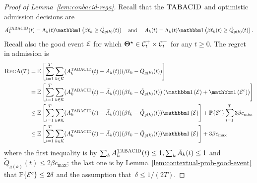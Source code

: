 \begin{proof}[Proof of Lemma~\ref{lem:conbacid-rega}]
Recall that the $\textsc{TABACID}$ and optimistic admission decisions are \[A_k^{\tabacid}(t) = \Lambda_k(t)\indic{\beta \ell_k \geq \tilde{Q}_{g(k)}(t)}\quad\text{and}\quad~\bar{A}_k(t) = \Lambda_k(t)\indic{\beta \bar{\ell}_k(t) \geq \tilde{Q}_{g(k)}(t)}.\] Recall also the good event $\mathcal{E}$ for which $\boldsymbol{\Theta}^\star \in \mathcal{C}_t^+ \times \mathcal{C}_t^-$ for any $t \geq 0$. The regret in admission is
\begin{align}
\textsc{RegA}(T)&=\expect{\sum_{t=1}^T \sum_{k\in\set{K}} (A_k^{\tabacid}(t) - \bar{A}_k(t))(\beta \ell_k-\tilde{Q}_{g(k)}(t))} \nonumber\\
&= \expect{\sum_{t=1}^T \sum_{k\in\set{K}} (A_k^{\tabacid}(t) - \bar{A}_k(t))(\beta \ell_k-\tilde{Q}_{g(k)}(t))\left(\indic{\set{E}} + \indic{\set{E}^c}\right)} \nonumber\\
&\leq \expect{\sum_{t=1}^T \sum_{k\in\set{K}} (A_k^{\tabacid}(t) - \bar{A}_k(t))(\beta \ell_k-\tilde{Q}_{g(k)}(t))\indic{\set{E}}} + \Pr\{\set{E}^c\}\sum_{t=1}^T 3\beta c_{\max} \nonumber\\
&\leq \expect{\sum_{t=1}^T \sum_{k\in\set{K}} (A_k^{\tabacid}(t) - \bar{A}_k(t))(\beta \ell_k-\tilde{Q}_{g(k)}(t))\indic{\set{E}}} + 3\beta c_{\max} \label{eq:con-rega-decomp}
\end{align}
where the first inequality is by $\sum_k A_k^{\textsc{TABACID}}(t) \leq 1, \sum_k \bar{A}_k(t) \leq 1$ and $\tilde{Q}_{g(k)}(t) \leq 2\beta c_{\max}$; the last one is by Lemma~\ref{lem:contextual-prob-good-event} that $\mathbb{P}\{\mathcal{E}^c\} \leq 2\delta$ and the assumption that~$\delta \leq 1 / (2T)$. 


\end{proof}
